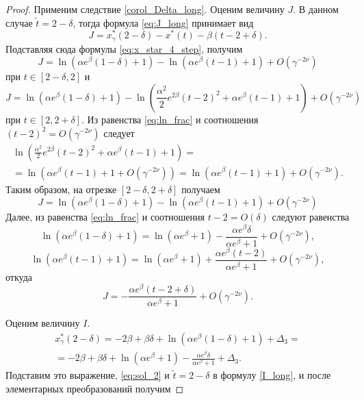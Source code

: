 \begin{proof}

Применим следствие \ref{corol_Delta_long}. Оценим величину $J$. В данном случае $\tilde{t} = 2 - \delta$, тогда формула \eqref{eq:J_long} принимает вид
%
\[
J = x_\gamma^*(2 - \delta) - x^*(t) - \beta(t - 2 + \delta).
\]
%
Подставляя сюда формулы \eqref{eq:x_star_4_step}, получим
%
\[
	J = \ln(\alpha e^{\beta} (1 - \delta) + 1) - \ln(\alpha e^{\beta}(t - 1) + 1) + O(\gamma^{-2\nu})
\]
при $t\in [2 - \delta, 2]$ и
%
\[
	J = \ln(\alpha e^{\beta} (1 - \delta) + 1) - \ln \left(\frac{\alpha^2}{2}e^{2\beta}(t-2)^2  + \alpha e^{\beta}(t-1)+1 \right) + O(\gamma^{-2\nu})
\]
при $t\in [2, 2 + \delta].$
%
Из равенства \eqref{eq:ln_frac} и соотношения $(t - 2)^2 = O(\gamma^{-2\nu})$ следует
\begin{multline*}
\ln \left(\frac{\alpha^2}{2} e^{2\beta} (t - 2)^2  + \alpha e^{\beta}(t - 1) + 1 \right) =\\= \ln (\alpha e^{\beta}(t - 1) + 1 + O(\gamma^{-2\nu})) = \ln (\alpha e^{\beta}(t - 1) + 1) + O(\gamma^{-2\nu}).
\end{multline*}
%
Таким образом, на отрезке $[2 - \delta, 2 + \delta]$ получаем
%
\[
J = \ln(\alpha e^{\beta} (1 - \delta) + 1) - \ln(\alpha e^{\beta}(t - 1) + 1) + O(\gamma^{-2\nu})
\]
%
Далее, из равенства \eqref{eq:ln_frac} и соотношения $t - 2 = O(\delta)$ следуют равенства
\[
 \ln(\alpha e^{\beta} (1 - \delta) + 1) = \ln(\alpha e^{\beta} + 1) - \frac{\alpha e^{\beta}\delta}{\alpha e^{\beta} + 1} + O(\gamma^{-2\nu}),
\]
\[
\ln(\alpha e^{\beta} (t - 1) + 1) = \ln(\alpha e^{\beta} + 1) + \frac{\alpha e^{\beta} (t - 2)}{\alpha e^{\beta} + 1} + O(\gamma^{-2\nu}),
\]
откуда
\begin{equation}
\label{eq:J_step4}
J = -\frac{\alpha e^{\beta} (t - 2 + \delta)}{\alpha e^{\beta} + 1} + O(\gamma^{-2\nu}).
\end{equation}

Оценим величину $I$.
%
\begin{multline*}
x_\gamma^*(2 - \delta) = -2\beta + \beta \delta + \ln(\alpha e^{\beta}(1 - \delta) + 1) + \Delta_3 =\\
= -2 \beta + \beta \delta + \ln(\alpha e^{\beta} + 1) - \frac{\alpha e^{\beta}\delta}{\alpha e^\beta + 1} +\Delta_3.
\end{multline*}
%
Подставим это выражение, \eqref{eq:sol_2} и $\tilde{t} = 2 - \delta$ в формулу \eqref{I_long}, и после элементарных преобразований получим


\end{proof}
